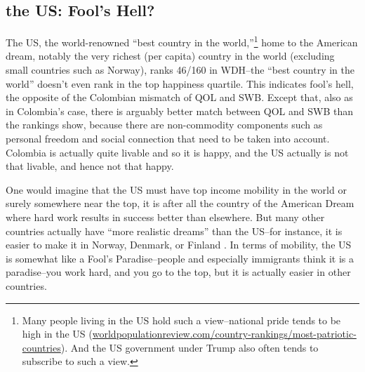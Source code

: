 \documentclass[10pt, letterpaper]{article}
\begin{document}
\begin{spacing}{2}


\subsection{the US:  Fool's Hell?} %

The US, the world-renowned ``best country in the world,''\footnote{Many people
  living in the US hold such a view--national pride tends to be high in the US
  (\url{worldpopulationreview.com/country-rankings/most-patriotic-countries}). And
 the US government under Trump also often tends to subscribe to such a view.} 
 home to the American dream, notably the very richest (per capita) country in the world (excluding small countries such as Norway), ranks 
46/160 in WDH--the ``best country in the world'' doesn't even rank in the top
happiness quartile. This indicates fool's hell, the opposite of the Colombian
mismatch of QOL and SWB. Except that, also as in Colombia's case, there is
arguably better match between QOL and SWB than the rankings show, because there are
non-commodity components such as personal freedom and social connection that
need to be taken into account. Colombia is
actually quite livable and so it is happy, and the US actually is not that livable,
and hence not that happy. %

One would
imagine that the US must have top income mobility in the world or surely
somewhere near the top, it is after all the country of the American Dream
where hard work results in success better than elsewhere. But 
many other countries actually have ``more realistic dreams''
 than the US--for instance, it is easier to make it in Norway, Denmark, or
 Finland \citep{corak04, corak11, corak13,economist12_oct12,economist12_oct13,economist12_oct13_B}.
 In terms of mobility, the US is somewhat like a Fool's Paradise--people and especially
 immigrants think it is a paradise--you work hard, and you go to the top, but it
 is actually easier in other countries.



\end{spacing}
\end{document}
